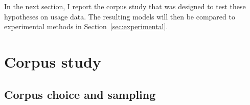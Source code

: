 \documentclass[USenglish]{article}
\begin{document}
\vspace{-1\baselineskip}

In the next section, I report the corpus study that was designed to test these hypotheses on usage data.
The resulting models will then be compared to experimental methods in Section~\ref{sec:experimental}.





\section{Corpus study}
\label{sec:corpusstudies}


\subsection{Corpus choice and sampling}
\label{sec:gettingdata}

\end{document}
